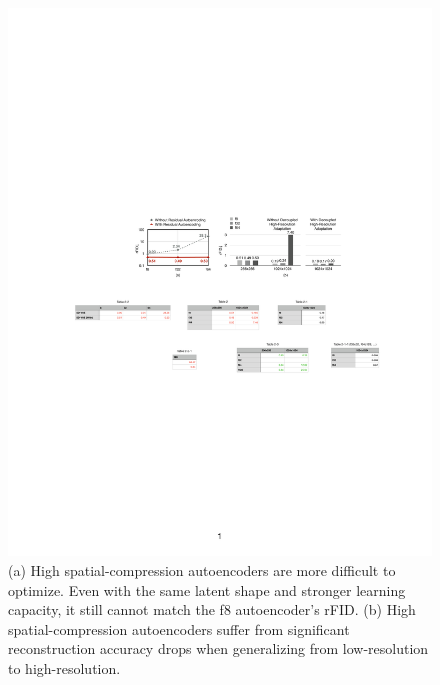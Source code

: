 \begin{figure}[t]
    \centering
    \includegraphics[width=1\linewidth]{figures/src/method_motivation.pdf}
    \vspace{-15pt}
    \caption{(a) High spatial-compression autoencoders are more difficult to optimize. Even with the same latent shape and stronger learning capacity, it still cannot match the f8 autoencoder's rFID. (b) High spatial-compression autoencoders suffer from significant reconstruction accuracy drops when generalizing from low-resolution to high-resolution. }
    \vspace{-10pt}
    \label{fig:method_motivation}
\end{figure}